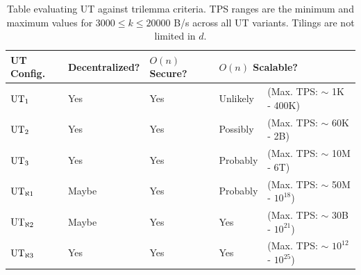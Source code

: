 \begin{table}[h]%
    \vspace{1em}
    \centering
    \caption{
        Table evaluating UT against trilemma criteria.
        TPS ranges are the minimum and maximum values for $3000 \le k \le 20000$ B/s across all UT variants.
        Tilings are not limited in $d$.
    }
    \begin{tabular}{lllll}
        \toprule
        UT Config. & Decentralized? & $O(n)$ Secure? & \multicolumn{2}{l}{$O(n)$ Scalable?} \\
        \midrule
        $\text{UT}_{1}$ & Yes & Yes & Unlikely & (Max. TPS: $\sim$ 1K - 400K) \\
        $\text{UT}_{2}$ & Yes & Yes & Possibly & (Max. TPS: $\sim$ 60K - 2B) \\
        $\text{UT}_{3}$ & Yes & Yes & Probably & (Max. TPS: $\sim$ 10M - 6T) \\
        $\UTinf{1}$ & Maybe\footnotemark{} & Yes & Probably & (Max. TPS: $\sim$ 50M - $10^{18}$) \\
        $\UTinf{2}$ & Maybe & Yes & Yes & (Max. TPS: $\sim$ 30B - $10^{21}$) \\
        $\UTinf{3}$ & Yes\footnotemark{} & Yes & Yes & (Max. TPS: $\sim$ $10^{12}$ - $10^{25}$) \\
        \bottomrule
    \end{tabular}
    \label{table:ut-vs-trilemma}
\end{table}

